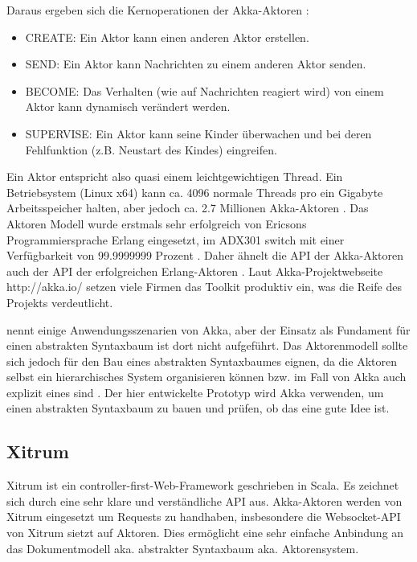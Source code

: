 Daraus ergeben sich die Kernoperationen der Akka-Aktoren \citep[S.~23]{Roestenburg}:

 
\begin{itemize}

\item CREATE: Ein Aktor kann einen anderen Aktor erstellen.
\item SEND: Ein Aktor kann Nachrichten zu einem anderen Aktor senden.
\item BECOME: Das Verhalten (wie auf Nachrichten reagiert wird) von einem Aktor kann dynamisch verändert werden.
\item SUPERVISE: Ein Aktor kann seine Kinder überwachen und bei deren Fehlfunktion (z.B. Neustart des Kindes) eingreifen.
\end{itemize}
 
Ein Aktor entspricht also quasi einem leichtgewichtigen Thread. Ein Betriebsystem (Linux x64) kann ca. 4096 normale Threads pro ein Gigabyte Arbeitsspeicher halten, aber jedoch ca. 2.7 Millionen Akka-Aktoren \citep[S.~20]{Roestenburg}. Das Aktoren Modell wurde erstmals sehr erfolgreich von Ericsons Programmiersprache Erlang eingesetzt, im ADX301 switch mit einer Verfügbarkeit von 99.9999999 Prozent \citep[S.~12]{Roestenburg}. Daher ähnelt die API der Akka-Aktoren auch der API der erfolgreichen Erlang-Aktoren \citep[S.~69]{Typesave}. Laut Akka-Projektwebseite http://akka.io/ setzen viele Firmen das Toolkit produktiv ein, was die Reife des Projekts verdeutlicht.

 
\citep[S.~7]{Typesave} nennt einige Anwendungsszenarien von Akka, aber der Einsatz als Fundament für einen abstrakten Syntaxbaum ist dort nicht aufgeführt. Das Aktorenmodell sollte sich jedoch für den Bau eines abstrakten Syntaxbaumes eignen, da die Aktoren selbst ein hierarchisches System organisieren können bzw. im Fall von Akka auch explizit eines sind \citep[S.~22]{Roestenburg}. Der hier entwickelte Prototyp wird Akka verwenden, um einen abstrakten Syntaxbaum zu bauen und prüfen, ob das eine gute Idee ist.

 
\subsection{Xitrum}\label{}
 
Xitrum ist ein controller-first-Web-Framework geschrieben in Scala. Es zeichnet sich durch eine sehr klare und verständliche API aus. Akka-Aktoren werden von Xitrum eingesetzt um Requests zu handhaben, insbesondere die Websocket-API von Xitrum sietzt auf Aktoren. Dies ermöglicht eine sehr einfache Anbindung an das Dokumentmodell aka. abstrakter Syntaxbaum aka. Aktorensystem.

